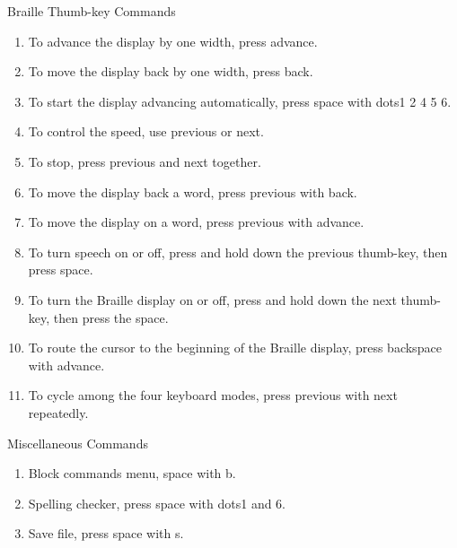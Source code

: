 \documentclass[10pt,letterpaper,twoside]{report}
\begin{document}
{{{{Braille Thumb-key Commands



\begin{enumerate}
	\item To advance the display by one width, press advance.
	      
	\item To move the display back by one width, press back.
	      
	\item To start the display advancing automatically, press space with dots1 2 4 5 6.
	      
	\item To control the speed, use previous or next.
	      
	\item To stop, press previous and next together.
	      
	\item To move the display back a word, press previous with back.
	      
	\item To move the display on a word, press previous with advance.
	      
	\item To turn speech on or off, press and hold down the previous thumb-key, then press space.
	      
	\item To turn the Braille display on or off, press and hold down the next thumb-key, then press the space.
	      
	\item To route the cursor to the beginning of the Braille display, press backspace with advance.
	      
	\item To cycle among the four keyboard modes, press previous with next repeatedly.
\end{enumerate}



Miscellaneous Commands



\begin{enumerate}
	\item Block commands menu, space with b.
	      
	\item Spelling checker, press space with dots1 and 6.
	      
	\item Save file, press space with s.
	      

\end{enumerate}}}}}
\end{document}
